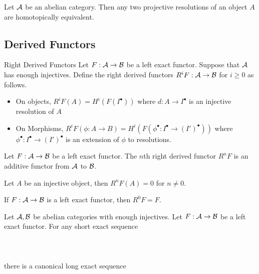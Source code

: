 \documentclass[a4paper]{article}
\begin{document}
\begin{lmm}{}{} Let $\mathcal{A}$ be an abelian category. Then any two projective resolutions of an object $A$ are homotopically equivalent. 
\end{lmm}

\subsection{Derived Functors}
\begin{defn}{Right Derived Functors}{} Let $F:\mathcal{A}\to\mathcal{B}$ be a left exact functor. Suppose that $\mathcal{A}$ has enough injectives. Define the right derived functors $R^iF:\mathcal{A}\to\mathcal{B}$ for $i\geq 0$ as follows. 
\begin{itemize}
\item On objects, $R^iF(A)=H^i(F(I^\bullet))$ where $d:A\to I^\bullet$ is an injective resolution of $A$
\item On Morphisms, $R^iF(\phi:A\to B)=H^i(F(\phi^\bullet:I^\bullet\to (I')^\bullet))$ where $\phi^\bullet:I^\bullet\to(I')^\bullet$ is an extension of $\phi$ to resolutions. 
\end{itemize}
\end{defn}

\begin{thm}{}{} Let $F:\mathcal{A}\to\mathcal{B}$ be a left exact functor. The $n$th right derived functor $R^nF$ is an additive functor from $\mathcal{A}$ to $\mathcal{B}$. 
\end{thm}

\begin{lmm}{}{} Let $A$ be an injective object, then $R^nF(A)=0$ for $n\neq 0$. 
\end{lmm}

\begin{crl}{}{} If $F:\mathcal{A}\to\mathcal{B}$ is a left exact functor, then $R^0F=F$. 
\end{crl}

\begin{thm}{}{} Let $\mathcal{A},\mathcal{B}$ be abelian categories with enough injectives. Let $F:\mathcal{A}\to\mathcal{B}$ be a left exact functor. For any short exact sequence \\~\\
\\~\\
there is a canonical long exact sequence \\~\\
\\~\\
\end{thm}
\end{document}
